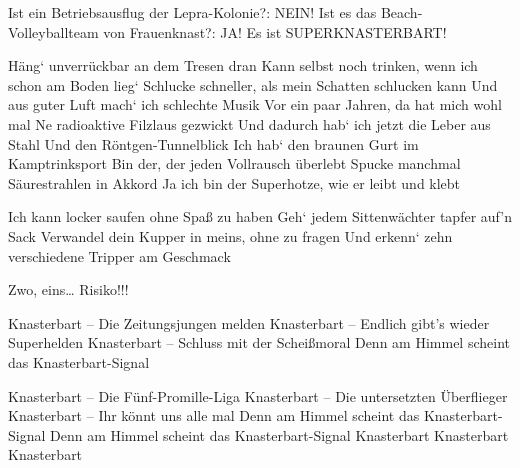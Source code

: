     \beginverse*\replay[bridge]
        Ist ein Betriebsausflug der Lepra-Kolonie?: NEIN!
        Ist es das Beach-Volleyballteam von Frauenknast?: JA!
        Es ist SUPERKNASTERBART!
    \endverse

    \beginverse\memorize[interlude1]
        Häng‘ unverrückbar an dem Tresen dran
        Kann selbst noch trinken, wenn ich schon am Boden lieg‘
        Schlucke schneller, als mein Schatten schlucken kann
        Und aus guter Luft mach‘ ich schlechte Musik
        Vor ein paar Jahren, da hat mich wohl mal
        Ne radioaktive Filzlaus gezwickt
        Und dadurch hab‘ ich jetzt die Leber aus Stahl
        Und den Röntgen-Tunnelblick
        Ich hab‘ den braunen Gurt im Kamptrinksport
        Bin der, der jeden Vollrausch überlebt
        Spucke manchmal Säurestrahlen in Akkord
        Ja ich bin der Superhotze, wie er leibt und klebt
    \endverse

    \beginverse\memorize[interlude2]
        Ich kann locker saufen ohne Spaß zu haben
        Geh‘ jedem Sittenwächter tapfer auf'n Sack
        Verwandel dein Kupper in meins, ohne zu fragen
        Und erkenn‘ zehn verschiedene Tripper am Geschmack
    \endverse

    \beginchorus\replay[chorus]
        Zwo, eins… Risiko!!!

        Knasterbart – Die Zeitungsjungen melden
        Knasterbart – Endlich gibt's wieder Superhelden
        Knasterbart – Schluss mit der Scheißmoral
        Denn am Himmel scheint das Knasterbart-Signal
    \beginverse\replay[verse]

    \beginchorus\replay[chorus]
        Knasterbart – Die Fünf-Promille-Liga
        Knasterbart – Die untersetzten Überflieger
        Knasterbart – Ihr könnt uns alle mal
        Denn am Himmel scheint das Knasterbart-Signal
        Denn am Himmel scheint das Knasterbart-Signal
        Knasterbart
        Knasterbart
        Knasterbart
    \endchorus
\endsong
